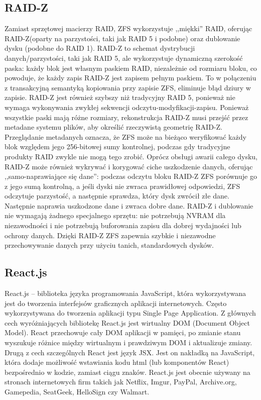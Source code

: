 \documentclass[12pt,a4paper]{article}
\begin{document}
		\subsection{RAID-Z}
			\indent Zamiast sprzętowej macierzy RAID, ZFS wykorzystuje ,,miękki'' RAID, oferując RAID-Z(oparty na parzystości, taki jak RAID 5 i podobne) oraz dublowanie dysku
			(podobne do RAID 1). RAID-Z to schemat dystrybucji danych/parzystości, taki jak RAID 5, ale wykorzystuje dynamiczną szerokość paska: każdy blok jest własnym paskiem
			RAID, niezależnie od rozmiaru
			bloku, co powoduje, że każdy zapis RAID-Z jest zapisem pełnym paskiem. To w połączeniu z transakcyjną semantyką kopiowania przy zapisie ZFS, eliminuje błąd dziury w zapisie.
			RAID-Z jest również szybszy niż tradycyjny RAID 5, ponieważ nie wymaga wykonywania zwykłej sekwencji odczytu-modyfikacji-zapisu. Ponieważ wszystkie paski mają różne rozmiary,
			rekonstrukcja RAID-Z musi przejść przez metadane systemu plików, aby określić rzeczywistą geometrię RAID-Z. Przeglądanie metadanych oznacza, że ZFS może na bieżąco
			weryfikować każdy blok względem jego 256-bitowej sumy kontrolnej, podczas gdy tradycyjne produkty RAID zwykle nie mogą tego zrobić. Oprócz obsługi awarii całego dysku,
			RAID-Z może również wykrywać i korygować ciche uszkodzenie danych, oferując ,,samo-naprawiające się dane'': podczas odczytu bloku RAID-Z ZFS porównuje go z jego sumą kontrolną,
			a jeśli dyski nie zwraca prawidłowej odpowiedzi, ZFS odczytuje parzystość, a następnie sprawdza, który dysk zwrócił złe dane. Następnie naprawia uszkodzone dane i zwraca
			dobre dane. RAID-Z i dublowanie nie wymagają żadnego specjalnego sprzętu: nie potrzebują NVRAM dla niezawodności i nie potrzebują buforowania zapisu dla dobrej wydajności
			lub ochrony danych. Dzięki RAID-Z ZFS zapewnia szybkie i niezawodne przechowywanie danych przy użyciu tanich, standardowych dysków.
		
		\subsection{React.js}
			\indent React.js – biblioteka języka programowania JavaScript, która wykorzystywana jest do tworzenia interfejsów graficznych aplikacji internetowych.
				Często wykorzystywana do tworzenia aplikacji typu Single Page Application. Z głównych cech wyróżniających bibliotekę React.js jest wirtualny DOM
				(Document Object Model). React przechowuje cały DOM aplikacji w pamięci, po zmianie stanu wyszukuje różnice między wirtualnym i prawdziwym DOM
				i aktualizuje zmiany. Drugą z cech szczególnych React jest język JSX. Jest on nakładką na JavaScript, która dodaje możliwość wstawiania kodu html
				(lub komponentów React) bezpośrednio w kodzie, zamiast ciągu znaków. React.js jest obecnie używany na stronach internetowych firm takich
				jak Netflix, Imgur, PayPal, Archive.org, Gamepedia, SeatGeek, HelloSign czy Walmart.
							 
\end{document}
